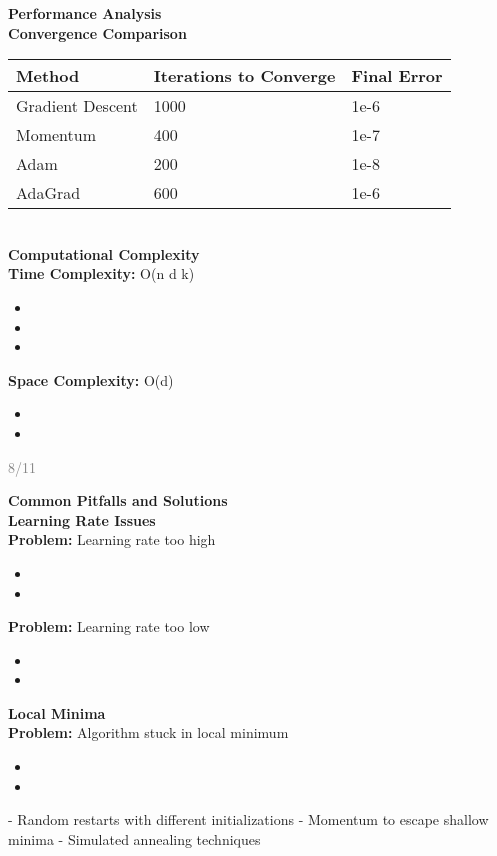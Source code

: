 \documentclass[11pt]{article}
\begin{document}
\textbf{\huge Performance Analysis}\\[0.5cm]
\textbf{\Large Convergence Comparison}\\[0.3cm]
\begin{center}
\begin{tabular}{lll}
\hline
\textbf{Method} & \textbf{Iterations to Converge} & \textbf{Final Error} \\
\hline
Gradient Descent & 1000 & 1e-6 \\
Momentum & 400 & 1e-7 \\
Adam & 200 & 1e-8 \\
AdaGrad & 600 & 1e-6 \\
\hline
\end{tabular}
\end{center}\\
\textbf{\Large Computational Complexity}\\[0.3cm]
\textbf{Time Complexity:} O(n  d  k)
\begin{itemize}
\item \1
\item \1
\item \1
\end{itemize}
\textbf{Space Complexity:} O(d)
\begin{itemize}
\item \1
\item \1
\end{itemize}

\vfill
\begin{flushright}
\textcolor{gray}{\small 8/11}
\end{flushright}

\newpage

\textbf{\huge Common Pitfalls and Solutions}\\[0.5cm]
\textbf{\Large Learning Rate Issues}\\[0.3cm]
\textbf{Problem:} Learning rate too high
\begin{itemize}
\item \1
\item \1
\end{itemize}
\textbf{Problem:} Learning rate too low  
\begin{itemize}
\item \1
\item \1
\end{itemize}
\textbf{\Large Local Minima}\\[0.3cm]
\textbf{Problem:} Algorithm stuck in local minimum
\begin{itemize}
\item \1
\item \1
\end{itemize}
  - Random restarts with different initializations
  - Momentum to escape shallow minima
  - Simulated annealing techniques
\end{document}
